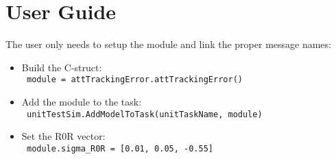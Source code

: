 
\section{User Guide}

The user only needs to setup the module and link the proper message names:

\begin{itemize}
\item Build the C-struct: \\
\texttt{    module = attTrackingError.attTrackingError()}
\item Add the module to the task: \\
 \texttt{ unitTestSim.AddModelToTask(unitTaskName, module)}
\item  Set the R0R vector: \\
\texttt{    module.sigma\_R0R  = [0.01, 0.05, -0.55]}
\end{itemize}